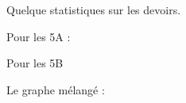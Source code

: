 
Quelque statistiques sur les devoirs.

\vfill

Pour les 5A :


\begin{center}
   
\end{center}

\vfill

Pour les 5B

\begin{center}
   
\end{center}

Le graphe mélangé :
\begin{center}
   
\end{center}

